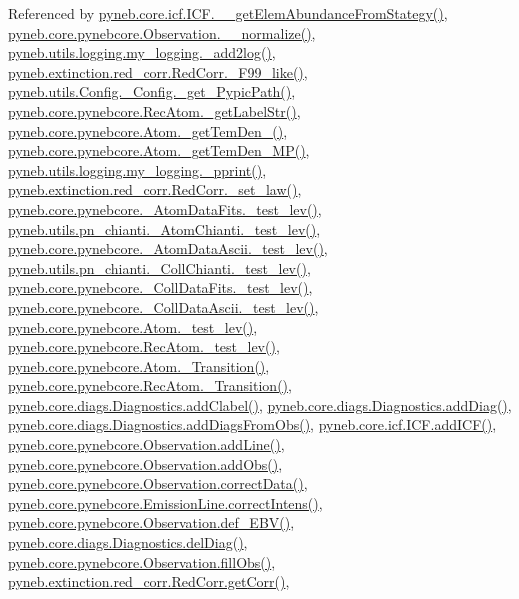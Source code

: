 Referenced by \hyperlink{icf_8py_source_l01075}{pyneb.\+core.\+icf.\+I\+C\+F.\+\_\+\+\_\+get\+Elem\+Abundance\+From\+Stategy()}, \hyperlink{pynebcore_8py_source_l03885}{pyneb.\+core.\+pynebcore.\+Observation.\+\_\+\+\_\+normalize()}, \hyperlink{logging_8py_source_l00059}{pyneb.\+utils.\+logging.\+my\+\_\+logging.\+\_\+add2log()}, \hyperlink{red__corr_8py_source_l00658}{pyneb.\+extinction.\+red\+\_\+corr.\+Red\+Corr.\+\_\+\+F99\+\_\+like()}, \hyperlink{_config_8py_source_l00086}{pyneb.\+utils.\+Config.\+\_\+\+Config.\+\_\+get\+\_\+\+Pypic\+Path()}, \hyperlink{pynebcore_8py_source_l02854}{pyneb.\+core.\+pynebcore.\+Rec\+Atom.\+\_\+get\+Label\+Str()}, \hyperlink{pynebcore_8py_source_l01803}{pyneb.\+core.\+pynebcore.\+Atom.\+\_\+get\+Tem\+Den\+\_()}, \hyperlink{pynebcore_8py_source_l01980}{pyneb.\+core.\+pynebcore.\+Atom.\+\_\+get\+Tem\+Den\+\_\+\+M\+P()}, \hyperlink{logging_8py_source_l00051}{pyneb.\+utils.\+logging.\+my\+\_\+logging.\+\_\+pprint()}, \hyperlink{red__corr_8py_source_l00176}{pyneb.\+extinction.\+red\+\_\+corr.\+Red\+Corr.\+\_\+set\+\_\+law()}, \hyperlink{pynebcore_8py_source_l00171}{pyneb.\+core.\+pynebcore.\+\_\+\+Atom\+Data\+Fits.\+\_\+test\+\_\+lev()}, \hyperlink{pn__chianti_8py_source_l00284}{pyneb.\+utils.\+pn\+\_\+chianti.\+\_\+\+Atom\+Chianti.\+\_\+test\+\_\+lev()}, \hyperlink{pynebcore_8py_source_l00435}{pyneb.\+core.\+pynebcore.\+\_\+\+Atom\+Data\+Ascii.\+\_\+test\+\_\+lev()}, \hyperlink{pn__chianti_8py_source_l00449}{pyneb.\+utils.\+pn\+\_\+chianti.\+\_\+\+Coll\+Chianti.\+\_\+test\+\_\+lev()}, \hyperlink{pynebcore_8py_source_l00660}{pyneb.\+core.\+pynebcore.\+\_\+\+Coll\+Data\+Fits.\+\_\+test\+\_\+lev()}, \hyperlink{pynebcore_8py_source_l01026}{pyneb.\+core.\+pynebcore.\+\_\+\+Coll\+Data\+Ascii.\+\_\+test\+\_\+lev()}, \hyperlink{pynebcore_8py_source_l01459}{pyneb.\+core.\+pynebcore.\+Atom.\+\_\+test\+\_\+lev()}, \hyperlink{pynebcore_8py_source_l02596}{pyneb.\+core.\+pynebcore.\+Rec\+Atom.\+\_\+test\+\_\+lev()}, \hyperlink{pynebcore_8py_source_l01367}{pyneb.\+core.\+pynebcore.\+Atom.\+\_\+\+Transition()}, \hyperlink{pynebcore_8py_source_l02696}{pyneb.\+core.\+pynebcore.\+Rec\+Atom.\+\_\+\+Transition()}, \hyperlink{diags_8py_source_l00410}{pyneb.\+core.\+diags.\+Diagnostics.\+add\+Clabel()}, \hyperlink{diags_8py_source_l00246}{pyneb.\+core.\+diags.\+Diagnostics.\+add\+Diag()}, \hyperlink{diags_8py_source_l00353}{pyneb.\+core.\+diags.\+Diagnostics.\+add\+Diags\+From\+Obs()}, \hyperlink{icf_8py_source_l00797}{pyneb.\+core.\+icf.\+I\+C\+F.\+add\+I\+C\+F()}, \hyperlink{pynebcore_8py_source_l03436}{pyneb.\+core.\+pynebcore.\+Observation.\+add\+Line()}, \hyperlink{pynebcore_8py_source_l03467}{pyneb.\+core.\+pynebcore.\+Observation.\+add\+Obs()}, \hyperlink{pynebcore_8py_source_l03906}{pyneb.\+core.\+pynebcore.\+Observation.\+correct\+Data()}, \hyperlink{pynebcore_8py_source_l03325}{pyneb.\+core.\+pynebcore.\+Emission\+Line.\+correct\+Intens()}, \hyperlink{pynebcore_8py_source_l03861}{pyneb.\+core.\+pynebcore.\+Observation.\+def\+\_\+\+E\+B\+V()}, \hyperlink{diags_8py_source_l00336}{pyneb.\+core.\+diags.\+Diagnostics.\+del\+Diag()}, \hyperlink{pynebcore_8py_source_l03452}{pyneb.\+core.\+pynebcore.\+Observation.\+fill\+Obs()}, \hyperlink{red__corr_8py_source_l00211}{pyneb.\+extinction.\+red\+\_\+corr.\+Red\+Corr.\+get\+Corr()}, 